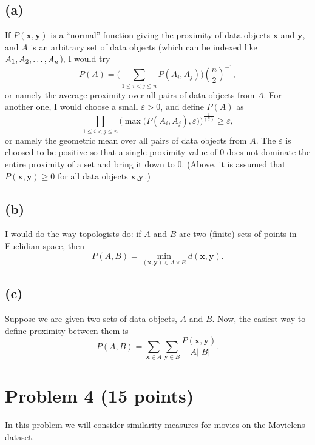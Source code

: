 \documentclass[10pt]{article}
\begin{document}
\color{black}
\subsection*{(a)}
If $P(\textbf{x}, \textbf{y})$ is a ``normal'' function giving the proximity of data objects $\textbf{x}$ and $\textbf{y}$, and $A$ is an arbitrary set of data objects (which can be indexed like $A_1, A_2, \dots,\\ A_n$), I would try 
\[
P(A) = \Bigg( \sum_{1 \leq i < j \leq n} P(A_i, A_j) \Bigg)\binom{n}{2}^{-1},
\]
or namely the average proximity over all pairs of data objects from $A$. For another one, I would choose a small $\varepsilon > 0$, and define $P(A)$ as
\[
\prod_{1 \leq i < j \leq n} \bigg( \max \big( P(A_i, A_j), \varepsilon \big) \bigg)^{ \frac{1}{\binom{n}{2}}} \geq \varepsilon,
\]
or namely the geometric mean over all pairs of data objects from $A$. The $\varepsilon$ is choosed to be positive so that a single proximity value of 0 does not dominate the entire proximity of a set and bring it down to 0. (Above, it is assumed that $P(\textbf{x}, \textbf{y}) \geq 0$ for all data objects $\textbf{x}, \textbf{y}$.)
 
\subsection*{(b)}
 I would do the way topologists do: if $A$ and $B$ are two (finite) sets of points in Euclidian space, then
 \[
 P(A, B) = \underset{(\textbf{x}, \textbf{y}) \in A \times B}{\min} d(\textbf{x}, \textbf{y}).
 \]
 
\subsection*{(c)}
Suppose we are given two sets of data objects, $A$ and $B$. Now, the easiest way to define proximity between them is
\[
P(A, B) = \sum_{\textbf{x} \in A} \sum_{\textbf{y} \in B} \frac{P(\textbf{x}, \textbf{y})}{|A||B|}.
\]  

\color{blue}
\section*{Problem 4 (15 points)}
In this problem we will consider similarity measures for movies on the Movielens dataset.
\color{black}
 
\end{document}
